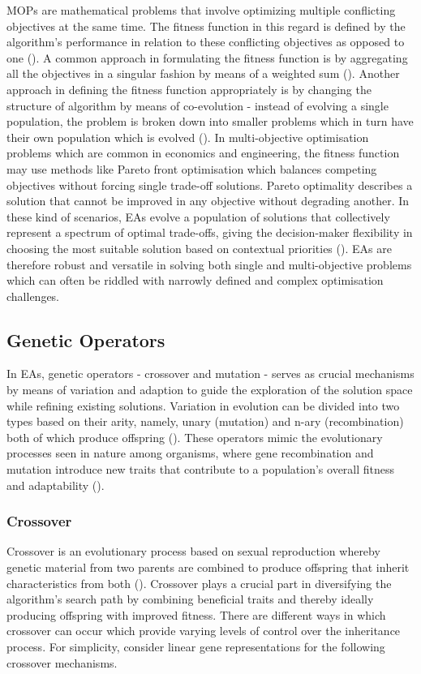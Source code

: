 \parbreak\noindent MOPs are mathematical problems that involve optimizing multiple conflicting objectives at the same time. The fitness function in this regard is defined by the algorithm's performance in relation to these conflicting objectives as opposed to one (\cite{okramergeneticalgorithms}). A common approach in formulating the fitness function is by aggregating all the objectives in a singular fashion by means of a weighted sum (\cite{okramergeneticalgorithms}). Another approach in defining the fitness function appropriately is by changing the structure of algorithm by means of co-evolution - instead of evolving a single population, the problem is broken down into smaller problems which in turn have their own population which is evolved (\cite{ZHOU201132}). In multi-objective optimisation problems which are common in economics and engineering, the fitness function may use methods like Pareto front optimisation which balances competing objectives without forcing single trade-off solutions. Pareto optimality describes a solution that cannot be improved in any objective without degrading another. In these kind of scenarios, EAs evolve a population of solutions that collectively represent a spectrum of optimal trade-offs, giving the decision-maker flexibility in choosing the most suitable solution based on contextual priorities (\cite{rachmawati2009multiobjective}). EAs are therefore robust and versatile in solving both single and multi-objective problems which can often be riddled with narrowly defined and complex optimisation challenges.

\subsection{Genetic Operators}\label{label:ea_genetic_operators}
In EAs, genetic operators - crossover and mutation - serves as crucial mechanisms by means of variation and adaption to guide the exploration of the solution space while refining existing solutions. Variation in evolution can be divided into two types based on their arity, namely, unary (mutation) and n-ary (recombination) both of which produce offspring (\cite{book_introduction_to_evolutionary_computing}). These operators mimic the evolutionary processes seen in nature among organisms, where gene recombination and mutation introduce new traits that contribute to a population's overall fitness and adaptability (\cite{handsOnGeneticAlgorithms}).

\subsubsection{Crossover}
Crossover is an evolutionary process based on sexual reproduction whereby genetic material from two parents are combined to produce offspring that inherit characteristics from both (\cite{okramergeneticalgorithms}). Crossover plays a crucial part in diversifying the algorithm's search path by combining beneficial traits and thereby ideally producing offspring with improved fitness. There are different ways in which crossover can occur which provide varying levels of control over the inheritance process. For simplicity, consider linear gene representations for the following crossover mechanisms.

